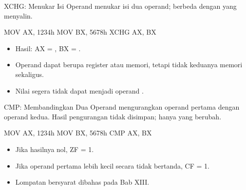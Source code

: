 \documentclass[aspectratio=169,11pt]{beamer}
\begin{document}
\begin{frame}[fragile]{XCHG: Menukar Isi Operand}
\small
{} menukar isi dua operand; berbeda dengan  yang
menyalin.

\vspace{0.2em}
\begin{kodeasm}[numbers=none]
MOV AX, 1234h
MOV BX, 5678h
XCHG AX, BX
\end{kodeasm}

\vspace{0.15em}
\begin{itemize}
    \item Hasil: AX = , BX = .
    \item Operand dapat berupa register atau memori, tetapi tidak
          keduanya memori sekaligus.
    \item Nilai segera tidak dapat menjadi operand .
\end{itemize}
\end{frame}

\begin{frame}[fragile]{CMP: Membandingkan Dua Operand}
\small
{} mengurangkan operand pertama dengan operand kedua. Hasil
pengurangan tidak disimpan; hanya  yang berubah.

\vspace{0.2em}
\begin{kodeasm}[numbers=none]
MOV AX, 1234h
MOV BX, 5678h
CMP AX, BX
\end{kodeasm}

\vspace{0.15em}
\begin{itemize}
    \item Jika hasilnya nol, ZF = 1.
    \item Jika operand pertama lebih kecil secara tidak bertanda,
          CF = 1.
    \item Lompatan bersyarat dibahas pada Bab XIII.
\end{itemize}
\end{frame}
\end{document}
